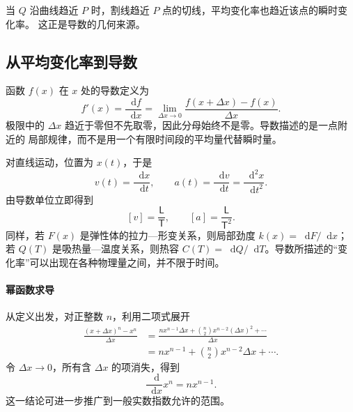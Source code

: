 \documentclass[UTF8,zihao=-4,oneside,openany]{ctexbook}
\numberwithin{equation}{section}
\newcommand{\dd}{\mathop{}\!\mathrm{d}}
\begin{document}
\begin{center}
\end{center}

当 $Q$ 沿曲线趋近 $P$ 时，割线趋近 $P$ 点的切线，平均变化率也趋近该点的瞬时变化率。
这正是导数的几何来源。

\subsection{从平均变化率到导数}

函数 $f(x)$ 在 $x$ 处的导数定义为
\begin{equation}
  f'(x)=\frac{\dd f}{\dd x}
  =\lim_{\Delta x\to0}
  \frac{f(x+\Delta x)-f(x)}{\Delta x}.
  \label{eq:derivative-definition}
\end{equation}
极限中的 $\Delta x$ 趋近于零但不先取零，因此分母始终不是零。导数描述的是一点附近的
局部规律，而不是用一个有限时间段的平均量代替瞬时量。

对直线运动，位置为 $x(t)$，于是
\begin{equation}
  v(t)=\frac{\dd x}{\dd t},
  \qquad
  a(t)=\frac{\dd v}{\dd t}=\frac{\dd^2x}{\dd t^2}.
  \label{eq:kinematic-derivatives}
\end{equation}
由导数单位立即得到
\[
  [v]=\frac{\mathsf L}{\mathsf T},
  \qquad
  [a]=\frac{\mathsf L}{\mathsf T^2}.
\]
同样，若 $F(x)$ 是弹性体的拉力—形变关系，则局部劲度
$k(x)=\dd F/\dd x$；若 $Q(T)$ 是吸热量—温度关系，则热容
$C(T)=\dd Q/\dd T$。导数所描述的“变化率”可以出现在各种物理量之间，并不限于时间。

\paragraph{幂函数求导}
从定义出发，对正整数 $n$，利用二项式展开
\begin{align*}
  \frac{(x+\Delta x)^n-x^n}{\Delta x}
  &=\frac{nx^{n-1}\Delta x+\binom n2x^{n-2}(\Delta x)^2+\cdots}{\Delta x}\\
  &=nx^{n-1}+\binom n2x^{n-2}\Delta x+\cdots.
\end{align*}
令 $\Delta x\to0$，所有含 $\Delta x$ 的项消失，得到
\begin{equation}
  \frac{\dd}{\dd x}x^n=nx^{n-1}.
  \label{eq:power-rule}
\end{equation}
这一结论可进一步推广到一般实数指数允许的范围。
\end{document}
